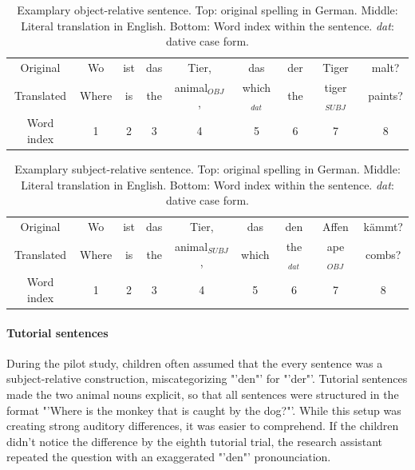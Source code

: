 \begin{table}[htb]
\vspace{5mm}
\begin{center}
\begin{tabular}{c|cccccccc}
Original & Wo & ist & das & Tier, & das & der & Tiger & malt?\\
Translated & Where & is & the & animal$_{OBJ}$, & which$_{dat}$ & the & tiger$_{SUBJ}$ & paints?\\
Word index & 1 & 2 & 3 & 4 & 5 & 6 & 7 & 8
\end{tabular}
\caption{\label{3.1.sentences} Examplary object-relative sentence. Top: original spelling in German. Middle: Literal translation in English. Bottom: Word index within the sentence. \emph{dat}: dative case form.}
\end{center}
\end{table}

\begin{table}[htb]
\vspace{5mm}
\begin{center}
\begin{tabular}{c|cccccccc}
Original & Wo & ist & das & Tier, & das & den & Affen & kämmt?\\
Translated & Where & is & the & animal$_{SUBJ}$, & which & the$_{dat}$ & ape$_{OBJ}$ & combs?\\
Word index & 1 & 2 & 3 & 4 & 5 & 6 & 7 & 8
\end{tabular}
\caption{\label{3.1.sentences} Examplary subject-relative sentence. Top: original spelling in German. Middle: Literal translation in English. Bottom: Word index within the sentence. \emph{dat}: dative case form.}
\end{center}
\end{table}

\paragraph{Tutorial sentences}
During the pilot study, children often assumed that the every sentence was a subject-relative construction, miscategorizing "'den"' for "'der"'.
Tutorial sentences made the two animal nouns explicit, so that all sentences were structured in the format "'Where is the monkey that is caught by the dog?"'.
While this setup was creating strong auditory differences, it was easier to comprehend.
If the children didn't notice the difference by the eighth tutorial trial, the research assistant repeated the question with an exaggerated "'den"' pronounciation.

